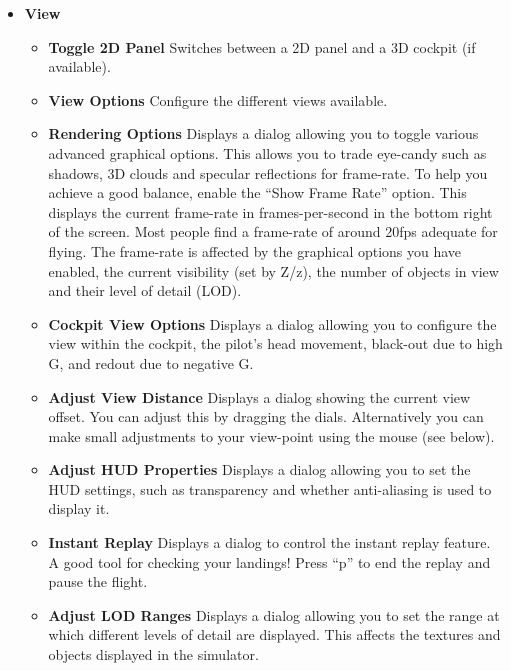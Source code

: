 \begin{itemize}
 \item \textbf{View}
 \begin{itemize}
  \item \textbf{Toggle 2D Panel}  Switches between a 2D panel and a 3D cockpit
(if available).
  \item \textbf{View Options}  Configure the different views available.
  \item \textbf{Rendering Options} Displays a dialog allowing you to toggle
various advanced graphical options.
  This allows you to trade eye-candy such as shadows, 3D clouds and specular
reflections for frame-rate.
  To help you achieve a good balance, enable the ``Show Frame Rate'' option.
  This displays the current frame-rate in frames-per-second in the bottom right
of the screen.
  Most people find a frame-rate of around 20fps adequate for flying. The
frame-rate is affected by the
  graphical options you have enabled, the current visibility (set by Z/z), the
number of objects in view
  and their level of detail (LOD).
  \item \textbf{Cockpit View Options}  Displays a dialog allowing you to configure
the view within the cockpit, the pilot's head movement, black-out due
to high G, and redout due to negative G.
  \item \textbf{Adjust View Distance}  Displays a dialog showing the current
view offset.
  You can adjust this by dragging the dials. Alternatively you can make small
adjustments
  to your view-point using the mouse (see below).
  \item \textbf{Adjust HUD Properties}  Displays a dialog allowing you to set
the HUD settings, such as transparency and whether anti-aliasing is used to display it.
  \item \textbf{Instant Replay} Displays a dialog to control the instant replay
feature.
  A good tool for checking your landings! Press ``p'' to end the replay and
pause the flight.
  \item \textbf{Adjust LOD Ranges} Displays a dialog allowing you to set the
range at which different
  levels of detail are displayed. This affects the textures and objects
displayed in the simulator.
 \end{itemize}


\end{itemize}
